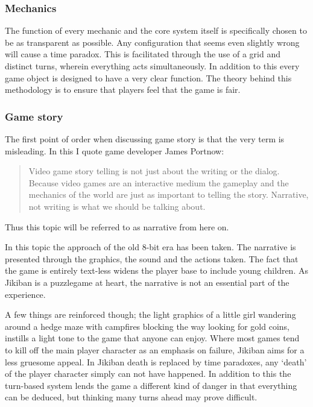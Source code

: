 \subsubsection{Mechanics}
The function of every mechanic and the core system itself is
specifically chosen to be as transparent as possible. Any configuration
that seems even slightly wrong will cause a time paradox. This is
facilitated through the use of a grid and distinct turns, wherein
everything acts simultaneously. In addition to this every game object
is designed to have a very clear function. The theory behind this
methodology is to ensure that players feel that the game is fair.

\subsubsection{Game story}
The first point of order when discussing game story is that the very
term is misleading. In this I quote game developer James Portnow\cite{portnow2}:

\begin{quotation}
Video game story telling is not just about the writing or the
dialog. Because video games are an interactive medium the gameplay
and the mechanics of the world are just as important to telling the
story. Narrative, not writing is what we should be talking about.
\end{quotation}

Thus this topic will be referred to as narrative from here on.

In this topic the approach of the old 8-bit era has been taken. The
narrative is presented through the graphics, the sound and the actions
taken. The fact that the game is entirely text-less widens the player
base to include young children. As Jikiban is a puzzlegame at heart,
the narrative is not an essential part of the experience.

A few things are reinforced though; the light graphics of a little
girl wandering around a hedge maze with campfires blocking the way
looking for gold coins, instills a light tone to the game that anyone
can enjoy.  Where most games tend to kill off the main player
character as an emphasis on failure, Jikiban aims for a less gruesome
appeal. In Jikiban death is replaced by time paradoxes, any ‘death’ of
the player character simply can not have happened. In addition to
this the turn-based system lends the game a different kind of danger
in that everything can be deduced, but thinking many turns ahead may
prove difficult.


